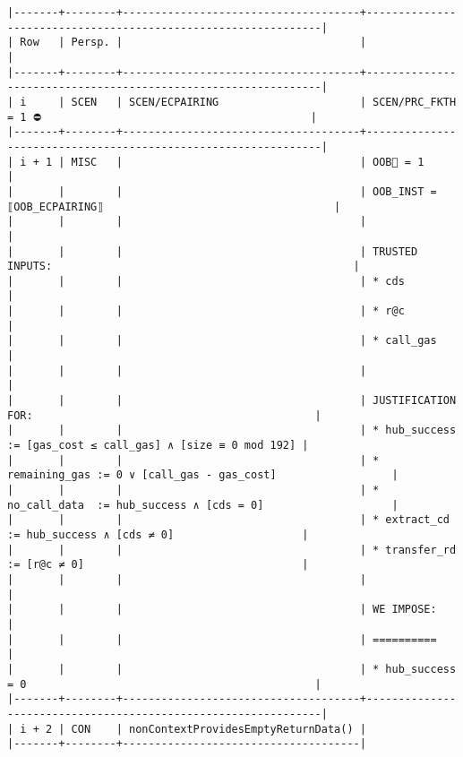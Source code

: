 \documentclass[varwidth=\maxdimen,margin=0.5cm,multi={verbatim}]{standalone}
\begin{document}
\begin{verbatim}
|-------+--------+-------------------------------------+---------------------------------------------------------------|
| Row   | Persp. |                                     |                                                               |
|-------+--------+-------------------------------------+---------------------------------------------------------------|
| i     | SCEN   | SCEN/ECPAIRING                      | SCEN/PRC_FKTH = 1 ⛔                                          |
|-------+--------+-------------------------------------+---------------------------------------------------------------|
| i + 1 | MISC   |                                     | OOB🚩 = 1                                                     |
|       |        |                                     | OOB_INST = ⟦OOB_ECPAIRING⟧                                    |
|       |        |                                     |                                                               |
|       |        |                                     | TRUSTED INPUTS:                                               |
|       |        |                                     | * cds                                                         |
|       |        |                                     | * r@c                                                         |
|       |        |                                     | * call_gas                                                    |
|       |        |                                     |                                                               |
|       |        |                                     | JUSTIFICATION FOR:                                            |
|       |        |                                     | * hub_success   := [gas_cost ≤ call_gas] ∧ [size ≡ 0 mod 192] |
|       |        |                                     | * remaining_gas := 0 ∨ [call_gas - gas_cost]                  |
|       |        |                                     | * no_call_data  := hub_success ∧ [cds = 0]                    |
|       |        |                                     | * extract_cd    := hub_success ∧ [cds ≠ 0]                    |
|       |        |                                     | * transfer_rd   := [r@c ≠ 0]                                  |
|       |        |                                     |                                                               |
|       |        |                                     | WE IMPOSE:                                                    |
|       |        |                                     | ==========                                                    |
|       |        |                                     | * hub_success = 0                                             |
|-------+--------+-------------------------------------+---------------------------------------------------------------|
| i + 2 | CON    | nonContextProvidesEmptyReturnData() |
|-------+--------+-------------------------------------|
\end{verbatim}
\end{document}
